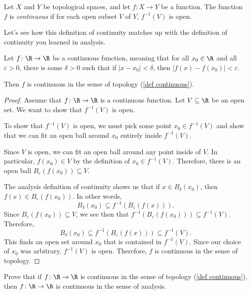 \documentclass[noname]{notes}
\begin{document}
\begin{definition}
\label{def continuous}
	Let $X$ and $Y$ be topological spaces, and let $f \colon X \to Y$ be a function. The function $f$ is \emph{continuous} if for each open subset $V$ of $Y$, $f^{-1}(V)$ is open. 
\end{definition}

Let's see how this definition of continuity matches up with the definition of continuity you learned in analysis. 

\begin{proposition}
	Let $f \colon \R \to \R$ be a continuous function, meaning that for all $x_0 \in \R$ and all $\varepsilon > 0$, there is some $\delta > 0$ such that if $|x - x_0| < \delta$, then $|f(x) - f(x_0)| < \varepsilon$. 
	
	Then $f$ is continuous in the sense of topology (\cref{def continuous}). 
\end{proposition}

\begin{proof}
	Assume that $f \colon \R \to \R$ is a continuous function. Let $V \subseteq \R$ be an open set. We want to show that $f^{-1}(V)$ is open. 
	
	To show that $f^{-1}(V)$ is open, we must pick some point $x_0 \in f^{-1}(V)$ and show that we can fit an open ball around $x_0$ entirely inside $f^{-1}(V)$. 
	
	Since $V$ is open, we can fit an open ball around any point inside of $V$. In particular, $f(x_0) \in V$ by the definition of $x_0 \in f^{-1}(V)$. Therefore, there is an open ball $B_\varepsilon(f(x_0)) \subseteq V$. 
	
	The analysis definition of continuity shows us that if $x \in B_\delta(x_0)$, then $f(x) \in B_\varepsilon(f(x_0))$. In other words, 
	\[
		B_\delta(x_0) \subseteq f^{-1}(B_\varepsilon(f(x))). 
	\]
	Since $B_\varepsilon(f(x_0)) \subseteq V$, we see then that $f^{-1}(B_\varepsilon(f(x_0))) \subseteq f^{-1}(V)$. Therefore, 
	\[
		B_\delta(x_0) \subseteq f^{-1}(B_\varepsilon(f(x))) \subseteq f^{-1}(V).
	\]
	This finds an open set around $x_0$ that is contained in $f^{-1}(V)$. Since our choice of $x_0$ was arbitrary, $f^{-1}(V)$ is open. Therefore, $f$ is continuous in the sense of topology.
\end{proof}

\begin{exercise}
	Prove that if $f \colon \R \to \R$ is continuous in the sense of topology (\cref{def continuous}), then $f \colon \R \to \R$ is continuous in the sense of analysis. 
\end{exercise}
\end{document}
